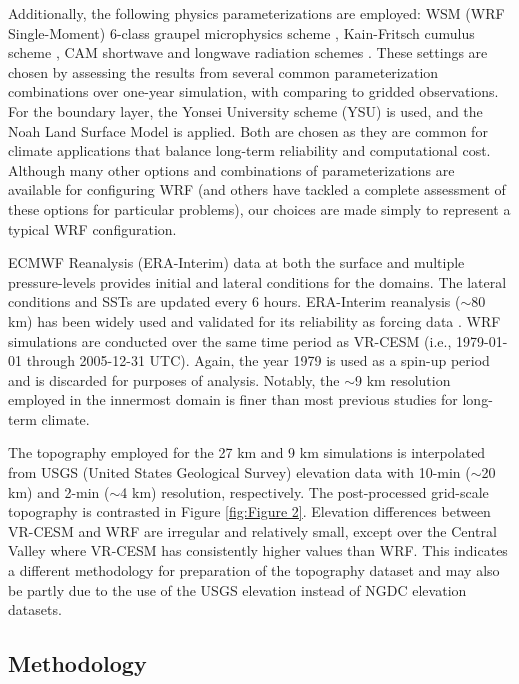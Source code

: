 \documentclass[draft,ms]{agutex}   %
\begin{document}
\begin{article}
Additionally, the following physics parameterizations are employed: WSM (WRF Single-Moment) 6-class graupel microphysics scheme \citep{hong2006wrf}, Kain-Fritsch cumulus scheme \citep{kain2004kain}, CAM shortwave and longwave radiation schemes \citep{collins2004description}.  These settings are chosen by assessing the results from several common parameterization combinations over one-year simulation, with comparing to gridded observations. For the boundary layer, the Yonsei University scheme (YSU) \citep{hong2006new} is used, and the Noah Land Surface Model \citep{chen2001coupling} is applied. Both are chosen as they are common for climate applications that balance long-term reliability and computational cost.  Although many other options and combinations of parameterizations are available for configuring WRF (and others have tackled a complete assessment of these options for particular problems), our choices are made simply to represent a typical WRF configuration.


ECMWF Reanalysis (ERA-Interim) data at both the surface and multiple pressure-levels provides initial and lateral conditions for the domains. The lateral conditions and SSTs are updated every 6 hours. ERA-Interim reanalysis ($\sim$80 km) has been widely used and validated for its reliability as forcing data \citep{dee2011era}. WRF simulations are conducted over the same time period as VR-CESM (i.e., 1979-01-01 through 2005-12-31 UTC). Again, the year 1979 is used as a spin-up period and is discarded for purposes of analysis. Notably, the $\sim$9 km resolution employed in the innermost domain is finer than most previous studies for long-term climate.

The topography employed for the 27 km and 9 km simulations is interpolated from USGS (United States Geological Survey) elevation data with 10-min ($\sim$20 km) and 2-min ($\sim$4 km) resolution, respectively. The post-processed grid-scale topography is contrasted in Figure \ref{fig:Figure 2}. Elevation differences between VR-CESM and WRF are irregular and relatively small, except over the Central Valley where VR-CESM has consistently higher values than WRF. This indicates a different methodology for preparation of the topography dataset and may also be partly due to the use of the USGS elevation instead of NGDC elevation datasets. 



\subsection{Methodology}


\end{article}
\end{document}
